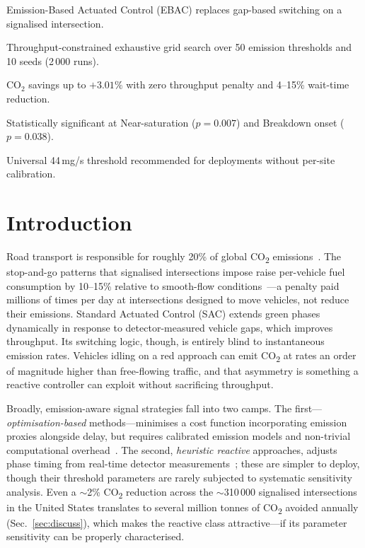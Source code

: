 \documentclass[review,3p,authoryear,times]{elsarticle}
\begin{document}
\begin{highlights}
\item Emission-Based Actuated Control (EBAC) replaces gap-based switching on a signalised intersection.
\item Throughput-constrained exhaustive grid search over 50 emission thresholds and 10 seeds (2\,000 runs).
\item CO$_2$ savings up to $+3.01\%$ with zero throughput penalty and 4--15\% wait-time reduction.
\item Statistically significant at Near-saturation ($p=0.007$) and Breakdown onset ($p=0.038$).
\item Universal 44\,mg/s threshold recommended for deployments without per-site calibration.
\end{highlights}



\section{Introduction}
\label{sec:intro}

Road transport is responsible for roughly 20\% of global
CO\textsubscript{2} emissions~\cite{EPA2023transport}. The stop-and-go
patterns that signalised intersections impose raise per-vehicle fuel
consumption by 10--15\% relative to smooth-flow
conditions~\cite{barth2009}---a penalty paid millions of times per day at
intersections designed to move vehicles, not reduce their emissions.
Standard Actuated Control (SAC) extends green phases dynamically in
response to detector-measured vehicle gaps, which improves throughput. Its
switching logic, though, is entirely blind to instantaneous emission rates.
Vehicles idling on a red approach can emit CO\textsubscript{2} at rates an
order of magnitude higher than free-flowing traffic, and that asymmetry is
something a reactive controller can exploit without sacrificing throughput.

Broadly, emission-aware signal strategies fall into two camps. The
first---\emph{optimisation-based} methods---minimises a cost function
incorporating emission proxies alongside delay, but requires calibrated
emission models and non-trivial computational overhead~\cite{li2004signal,
stevanovic2009}. The second, \emph{heuristic reactive} approaches, adjusts
phase timing from real-time detector measurements~\cite{he2014multimodal,
feng2015}; these are simpler to deploy, though their threshold parameters
are rarely subjected to systematic sensitivity analysis. Even a
$\sim$2\% CO\textsubscript{2} reduction across the $\sim$310\,000
signalised intersections in the United States translates to several million
tonnes of CO\textsubscript{2} avoided annually
(Sec.~\ref{sec:discuss}), which makes the reactive class attractive---if its
parameter sensitivity can be properly characterised.
\end{document}

